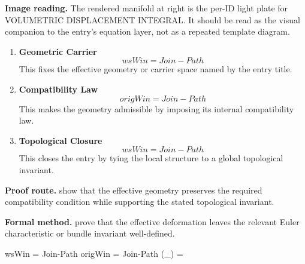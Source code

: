 \begin{samepage}
\noindent\begin{minipage}[t]{0.45\linewidth}
\vspace{0pt}
\raggedright
\scriptsize\textbf{Image reading.} The rendered manifold at right is the per-ID light plate for VOLUMETRIC DISPLACEMENT INTEGRAL. It should be read as the visual companion to the entry's equation layer, not as a repeated template diagram.\par
\end{minipage}\hfill
\begin{minipage}[t]{0.53\linewidth}
\vspace*{-0.10in}
\raggedright
{}
\end{minipage}
\end{samepage}

\clearpage


\begin{enumerate}[leftmargin=1.6em,itemsep=9pt,topsep=6pt]
\item \textbf{Geometric Carrier}
\[
wsWin = Join-Path
\]
This fixes the effective geometry or carrier space named by the entry title.

\item \textbf{Compatibility Law}
\[
origWin = Join-Path
\]
This makes the geometry admissible by imposing its internal compatibility law.

\item \textbf{Topological Closure}
\[
wsWin = Join-Path
\]
This closes the entry by tying the local structure to a global topological invariant.
\end{enumerate}

\textbf{Proof route.} show that the effective geometry preserves the required compatibility condition while supporting the stated topological invariant.

\textbf{Formal method.} prove that the effective deformation leaves the relevant Euler characteristic or bundle invariant well-defined.

\medskip
{}

\begin{tzpsnapshot}
\end{tzpsnapshot}

\tzpequationlinks
  {wsWin = Join-Path}
  {origWin = Join-Path}
  {\chi(_{}) = \cdots}

